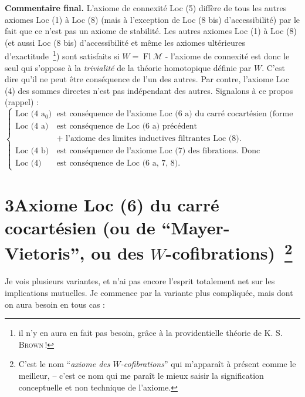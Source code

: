 \documentclass[11pt]{article}
\newcommand{\printedpage}[1]{\marginpar{\footnotesize p.~#1}}
\newcommand{\msp}[1]{\marginpar{\footnotesize [#1]}}
\newcommand{\Fl}{\operatorname{Fl}}
\begin{document}
\textbf{Commentaire final.} L'axiome de connexité Loc (5) diffère de tous les autres axiomes Loc (1) à Loc (8) (mais à l'exception de Loc (8 bis) d'accessibilité) par le fait que ce n'est pas un axiome de stabilité. Les autres axiomes Loc (1) à Loc (8) (et aussi Loc (8 bis) d'accessibilité et même les axiomes ultérieures %
d'exactitude~\footnote[7]{il n'y en aura en fait pas besoin, grâce à la providentielle théorie de K. S. \textsc{Brown}\,!}) sont satisfaits si $W=\Fl\mathcal{M}$ - l'axiome de connexité est donc le seul qui s'oppose à la \textit{trivialité} de la théorie homotopique définie par $W$. C'est dire qu'il ne peut être conséquence de l'un des autres. Par contre, l'axiome Loc (4) des sommes directes n'est pas indépendant des autres. Signalons à ce propos (rappel) :
\[
\left\{
\begin{array}{rl}
\text{Loc (4 a$_0$)} & \text{est conséquence de l'axiome Loc (6 a) du carré cocartésien (forme directe).}\\[1ex]
\text{Loc (4 a)} & \text{est conséquence de Loc (6 a) précédent}\\
 & \text{+ l'axiome des limites inductives filtrantes Loc (8).}\\[3ex]
\text{Loc (4 b)} & \text{est conséquence de l'axiome Loc (7) des fibrations. Donc}\\[1ex]
\text{Loc (4)} & \text{est conséquence de Loc (6 a, 7, 8).}
\end{array}
\right.
\]

\printedpage{12}
\msp{page 16'}

\section*{3\quad Axiome Loc (6) du carré cocartésien (ou de “Mayer-Vietoris”, ou des $W$-cofibrations)~\footnote[8]{C'est le nom “\textit{axiome des $W$-cofibrations}” qui m'apparaît à présent comme le meilleur, -- c'est ce nom qui me paraît le mieux saisir la signification conceptuelle et non technique de l'axiome.}}

Je vois plusieurs variantes, et n'ai pas encore l'esprit totalement net sur les implications mutuelles. Je commence par la variante plus compliquée, mais dont on aura besoin en tous cas :
\end{document}
